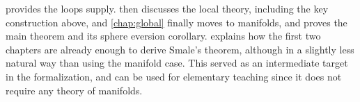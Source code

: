  provides the loops supply.  then
discusses the local theory, including the key construction above,
and \cref{chap:global} finally moves to manifolds, and proves the main
theorem and its sphere eversion corollary.
 explains how the first two chapters are already
enough to derive Smale's theorem, although in a slightly less natural way than
using the manifold case. This served as an intermediate target in the
formalization, and can be used for elementary teaching since it does not
require any theory of manifolds.

